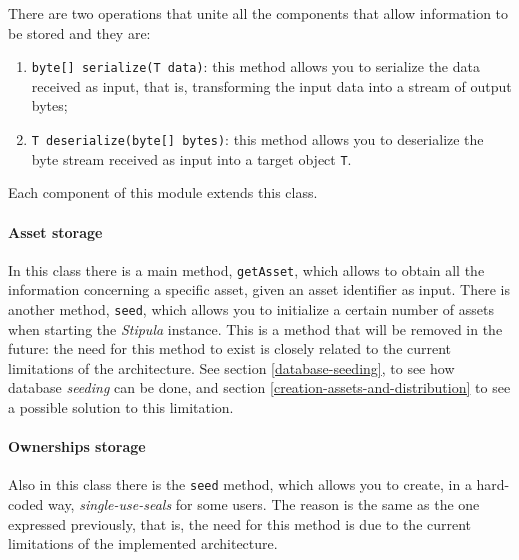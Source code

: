 There are two operations that unite all the components that allow information to be stored and they are:
\begin{enumerate}
  \item \verb|byte[] serialize(T data)|: this method allows you to serialize the data received as input, 
  that is, transforming the input data into a stream of output bytes;
  \item \verb|T deserialize(byte[] bytes)|: this method allows you to deserialize the byte stream 
  received as input into a target object \verb|T|.
\end{enumerate}

Each component of this module extends this class.

\paragraph{Asset storage}

In this class there is a main method, \verb|getAsset|, which allows to obtain all the information 
concerning a specific asset, given an asset identifier as input. There is another method, \verb|seed|, 
which allows you to initialize a certain number of assets when starting the \textit{Stipula} instance. 
This is a method that will be removed in the future: the need for this method to exist is closely related 
to the current limitations of the architecture. See section \ref{database-seeding}, to see how database 
\textit{seeding} can be done, and section \ref{creation-assets-and-distribution} to see a possible 
solution to this limitation.

\paragraph{Ownerships storage}

Also in this class there is the \verb|seed| method, which allows you to create, in a hard-coded way, 
\textit{single-use-seals} for some users. The reason is the same as the one expressed previously, that is, 
the need for this method is due to the current limitations of the implemented architecture.

